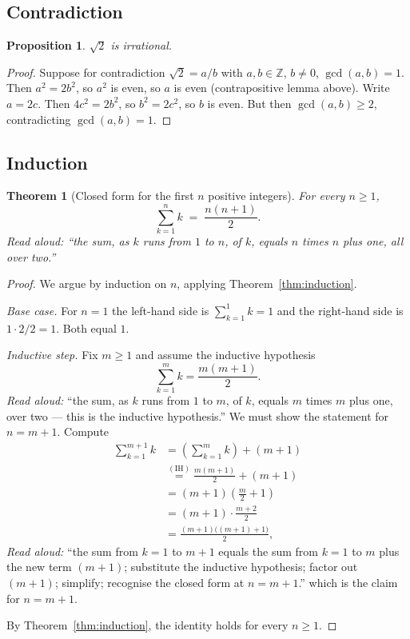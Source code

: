 \documentclass[11pt]{article}
\newtheorem{theorem}{Theorem}
\newtheorem{proposition}{Proposition}
\begin{document}
\subsection*{Contradiction}

\begin{proposition}
$\sqrt{2}$ is irrational.
\end{proposition}
\begin{proof}
Suppose for contradiction $\sqrt{2} = a/b$ with $a, b \in \mathbb{Z}$, $b \neq 0$,
$\gcd(a,b) = 1$. Then $a^2 = 2b^2$, so $a^2$ is even, so $a$ is even
(contrapositive lemma above). Write $a = 2c$. Then $4c^2 = 2b^2$, so
$b^2 = 2c^2$, so $b$ is even. But then $\gcd(a,b) \geq 2$, contradicting
$\gcd(a,b) = 1$.
\end{proof}

\subsection*{Induction}

\begin{theorem}[Closed form for the first $n$ positive integers]
For every $n \geq 1$,
\[
\sum_{k=1}^{n} k \;=\; \frac{n(n+1)}{2}.
\]
\emph{Read aloud:} ``the sum, as $k$ runs from $1$ to $n$, of $k$, equals
$n$ times $n$ plus one, all over two.''
\end{theorem}
\begin{proof}
We argue by induction on $n$, applying Theorem~\ref{thm:induction}.

\emph{Base case.} For $n = 1$ the left-hand side is $\sum_{k=1}^1 k = 1$ and
the right-hand side is $1 \cdot 2 / 2 = 1$. Both equal $1$.

\emph{Inductive step.} Fix $m \geq 1$ and assume the inductive hypothesis
\[
\sum_{k=1}^{m} k = \frac{m(m+1)}{2}. \tag{IH}
\]
\emph{Read aloud:} ``the sum, as $k$ runs from $1$ to $m$, of $k$, equals
$m$ times $m$ plus one, over two --- this is the inductive hypothesis.''
We must show the statement for $n = m+1$. Compute
\begin{align*}
\sum_{k=1}^{m+1} k
  &= \left( \sum_{k=1}^{m} k \right) + (m+1) \\
  &\stackrel{(\text{IH})}{=} \frac{m(m+1)}{2} + (m+1) \\
  &= (m+1) \left( \frac{m}{2} + 1 \right) \\
  &= (m+1) \cdot \frac{m+2}{2} \\
  &= \frac{(m+1)\big((m+1)+1\big)}{2},
\end{align*}
\emph{Read aloud:} ``the sum from $k=1$ to $m+1$ equals the sum from $k=1$ to
$m$ plus the new term $(m+1)$; substitute the inductive hypothesis; factor out
$(m+1)$; simplify; recognise the closed form at $n = m+1$.''
which is the claim for $n = m+1$.

By Theorem~\ref{thm:induction}, the identity holds for every $n \geq 1$.
\end{proof}
\end{document}
